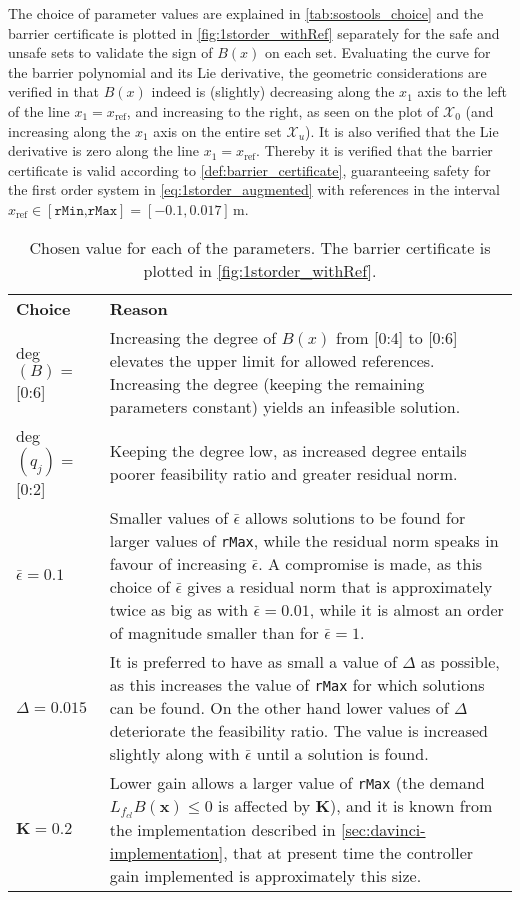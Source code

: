 The choice of parameter values are explained in \autoref{tab:sostools_choice} and the barrier certificate is plotted in \autoref{fig:1storder_withRef} separately for the safe and unsafe sets to validate the sign of $B(x)$ on each set. 
Evaluating the curve for the barrier polynomial and its Lie derivative,  the geometric considerations are verified in that $B(x)$ indeed is (slightly) decreasing along the $x_1$ axis to the left of the line $x_1=x_\text{ref}$, and increasing to the right, as seen on the plot of $\mathcal{X}_0$ (and increasing along the $x_1$ axis on the entire set $\mathcal{X}_u$). It is also verified that the Lie derivative is zero along the line $x_1=x_\text{ref}$. Thereby it is verified that the barrier certificate is valid according to \autoref{def:barrier_certificate},  guaranteeing  safety for the first order system in \autoref{eq:1storder_augmented} with references in the interval $x_\text{ref}\in [\texttt{rMin,rMax}]=[-0.1,0.017]$\,m.



\begin{table}[H]
	\begin{tabularx}{\textwidth}{l X}
		\rowcolor{HeaderBlue}
		\textbf{Choice} & \textbf{Reason}\\
		deg$(B)=$ [0:6] & Increasing the degree of $B(x)$ from [0:4] to [0:6] elevates the upper limit for allowed references. Increasing the degree (keeping the remaining parameters constant) yields an infeasible solution. \\
		\rowcolor{textBlue}
		deg$(q_j)=$ [0:2] & Keeping the degree low, as increased degree entails poorer feasibility ratio and greater residual norm.\\
		$\bar{\epsilon}=0.1$ & Smaller values of  $\bar{\epsilon}$ allows solutions to be found for larger values of \texttt{rMax}, while the residual norm  speaks in favour of increasing $\bar{\epsilon}$. A compromise is made, as this choice of $\bar{\epsilon}$ gives a residual norm that is approximately twice as big as with $\bar{\epsilon}=0.01$, while it is almost an order of magnitude smaller than for $\bar{\epsilon}=1$.\\
		\rowcolor{textBlue}
		$\Delta=0.015$ & It is preferred to have as small a value of $\Delta$ as possible, as this increases the value of \texttt{rMax} for which solutions can be found. On the other hand lower  values of $\Delta$ deteriorate the feasibility ratio. The value is increased slightly along with $\bar{\epsilon}$ until a solution is found. \\
		$\textbf{K}=0.2$ & Lower gain allows a larger value of \texttt{rMax} (the demand $L_{f_{cl}}B(\textbf{x}) \leq 0$ is affected by $\textbf{K}$), and it is known from the implementation described in \autoref{sec:davinci-implementation}, that at present time the controller gain implemented is approximately this size.
	\end{tabularx}
	\caption{Chosen value for each of the parameters. The barrier certificate is plotted in \autoref{fig:1storder_withRef}.}
	\label{tab:sostools_choice}
\end{table}


